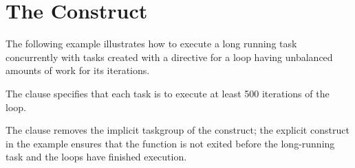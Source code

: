 \pagebreak
\section{The  Construct}
\label{sec:taskloop}

The following example illustrates how to execute a long running task concurrently with tasks created
with a  directive for a loop having unbalanced amounts of work for its iterations.

The  clause specifies that each task is to execute at least 500 iterations of the loop. 

The  clause removes the implicit taskgroup of the  construct; the explicit  construct in the example ensures that the function is not exited before the long-running task and the loops have finished execution.


